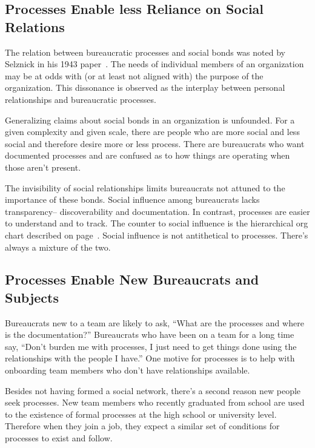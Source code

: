 \subsection*{Processes Enable less Reliance on Social Relations}

The relation between bureaucratic processes and social bonds was noted by Selznick in his 1943 paper~\cite{1943_Selznick}. The needs of individual members of an organization may be at odds with (or at least not aligned with) the purpose of the organization. This dissonance is observed as the interplay between personal relationships and bureaucratic processes.

Generalizing claims about social bonds in an organization is unfounded. 
For a given complexity and given scale, there are people who are more social and less social and therefore desire more or less process.
There are bureaucrats who want documented processes and are confused as to how things are operating when those aren't present. 

The invisibility of social relationships limits bureaucrats not attuned to the importance of these bonds. 
Social influence among bureaucrats lacks transparency-- discoverability and documentation. 
In contrast, processes are easier to understand and to track. The counter to social influence is the hierarchical \gls{org chart} described on 
page~\pageref{sec:org-chart-as-guide-and-lie}.
Social influence is not antithetical to processes. There's always a mixture of the two.


\subsection*{Processes Enable New Bureaucrats and Subjects}

Bureaucrats new to a team are likely to ask, ``What are the processes and where is the documentation?'' Bureaucrats who have been on a team for a long time say, ``Don't burden me with processes, I just need to get things done using the relationships with the people I have.'' One motive for processes is to help with onboarding team members who don't have relationships available.

Besides not having formed a social network, there's a second reason new people seek processes. New team members who recently graduated from school are used to the existence of formal processes at the high school or university level. Therefore when they join a job, they expect a similar set of conditions for processes to exist and follow.

